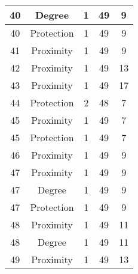 \documentclass[results.tex]{subfiles}
\begin{document}
\begin{center}
\begin{tabular}{| c || c | c | c | c |}
            \hline
            40                      & Degree                       & 1                      & 49                      & 9                    \\
            \hline
            40                      & Protection                   & 1                      & 49                      & 9                    \\
            \hline
            41                      & Proximity                    & 1                      & 49                      & 9                    \\
            \hline
            42                      & Proximity                    & 1                      & 49                      & 13                   \\
            \hline
            43                      & Proximity                    & 1                      & 49                      & 17                   \\
            \hline
            44                      & Protection                   & 2                      & 48                      & 7                    \\
            \hline
            45                      & Proximity                    & 1                      & 49                      & 7                    \\
            \hline
            45                      & Protection                   & 1                      & 49                      & 7                    \\
            \hline
            46                      & Proximity                    & 1                      & 49                      & 9                    \\
            \hline
            47                      & Proximity                    & 1                      & 49                      & 9                    \\
            \hline
            47                      & Degree                       & 1                      & 49                      & 9                    \\
            \hline
            47                      & Protection                   & 1                      & 49                      & 9                    \\
            \hline
            48                      & Proximity                    & 1                      & 49                      & 11                   \\
            \hline
            48                      & Degree                       & 1                      & 49                      & 11                   \\
            \hline
            49                      & Proximity                    & 1                      & 49                      & 13                   \\
            \hline
        \end{tabular}
    \end{center}
\end{document}
